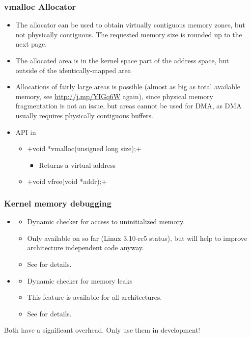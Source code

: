 \begin{frame}[fragile]
  \frametitle{vmalloc Allocator}
  \begin{itemize}
  \item The  allocator can be used to obtain virtually
    contiguous memory zones, but not physically contiguous. The
    requested memory size is rounded up to the next page.
  \item The allocated area is in the kernel space part of the address
    space, but outside of the identically-mapped area
  \item Allocations of fairly large areas is possible (almost as big
    as total available memory, see \url{http://j.mp/YIGq6W} again),
    since physical memory fragmentation is not an issue, but areas
    cannot be used for DMA, as DMA usually requires physically
    contiguous buffers.
  \item API in 
    \begin{itemize}
    \item {}+void *vmalloc(unsigned long size);+
      \begin{itemize}
      \item Returns a virtual address
      \end{itemize}
    \item {}+void vfree(void *addr);+
    \end{itemize}
  \end{itemize}
\end{frame}

\begin{frame}
  \frametitle{Kernel memory debugging}
  \begin{itemize}
  \item {}
    \begin{itemize}
    \item Dynamic checker for access to uninitialized memory.
    \item Only available on  so far (Linux 3.10-rc5 status), but will
      help to improve architecture independent code anyway.
    \item See  for details.
    \end{itemize}
  \item {}
    \begin{itemize}
    \item Dynamic checker for memory leaks
    \item This feature is available for all architectures.
    \item See  for details.
    \end{itemize}
  \end{itemize}
  Both have a significant overhead. Only use them in development!
\end{frame}
